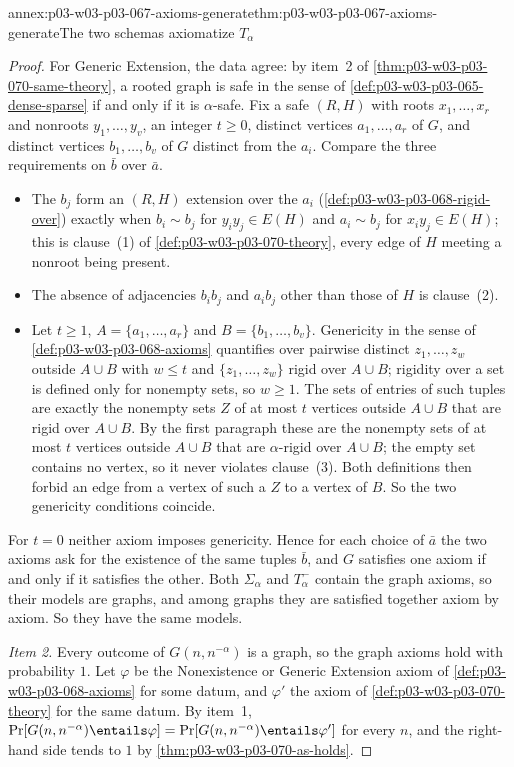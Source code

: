 \begin{annexitem}{annex:p03-w03-p03-067-axioms-generate}{thm:p03-w03-p03-067-axioms-generate}{The two schemas axiomatize \(T_\alpha\)}
\begin{proof}
For Generic Extension, the data agree: by item~2 of
\cref{thm:p03-w03-p03-070-same-theory}, a rooted graph is safe in the sense
of \cref{def:p03-w03-p03-065-dense-sparse} if and only if it is
\(\alpha\)-safe.  Fix a safe \((R,H)\) with roots \(x_1,\ldots,x_r\) and
nonroots \(y_1,\ldots,y_v\), an integer \(t\geq0\), distinct vertices
\(a_1,\ldots,a_r\) of \(G\), and distinct vertices \(b_1,\ldots,b_v\) of
\(G\) distinct from the \(a_i\).  Compare the three requirements on
\(\bar b\) over \(\bar a\).
\begin{itemize}
\item The \(b_j\) form an \((R,H)\) extension over the \(a_i\)
  (\cref{def:p03-w03-p03-068-rigid-over}) exactly when \(b_i\sim b_j\) for
  \(y_iy_j\in E(H)\) and \(a_i\sim b_j\) for \(x_iy_j\in E(H)\); this is
  clause~(1) of \cref{def:p03-w03-p03-070-theory}, every edge of \(H\)
  meeting a nonroot being present.
\item The absence of adjacencies \(b_ib_j\) and \(a_ib_j\) other than those of
  \(H\) is clause~(2).
\item Let \(t\geq1\), \(A=\{a_1,\ldots,a_r\}\) and \(B=\{b_1,\ldots,b_v\}\).
  Genericity in the sense of \cref{def:p03-w03-p03-068-axioms} quantifies
  over pairwise distinct \(z_1,\ldots,z_w\) outside \(A\cup B\) with
  \(w\leq t\) and \(\{z_1,\ldots,z_w\}\) rigid over \(A\cup B\); rigidity
  over a set is defined only for nonempty sets, so \(w\geq1\).  The sets of
  entries of such tuples are exactly the nonempty sets \(Z\) of at most
  \(t\) vertices outside \(A\cup B\) that are rigid over \(A\cup B\).  By the
  first paragraph these are the nonempty sets of at most \(t\) vertices
  outside \(A\cup B\) that are \(\alpha\)-rigid over \(A\cup B\); the empty
  set contains no vertex, so it never violates clause~(3).  Both definitions
  then forbid an edge from a vertex of such a \(Z\) to a vertex of \(B\).  So
  the two genericity conditions coincide.
\end{itemize}
For \(t=0\) neither axiom imposes genericity.  Hence for each choice of
\(\bar a\) the two axioms ask for the existence of the same tuples
\(\bar b\), and \(G\) satisfies one axiom if and only if it satisfies the
other.  Both \(\Sigma_\alpha\) and \(T^-_\alpha\) contain the graph axioms,
so their models are graphs, and among graphs they are satisfied together
axiom by axiom.  So they have the same models.

\emph{Item 2.}  Every outcome of \(G(n,n^{-\alpha})\) is a graph, so the graph
axioms hold with probability \(1\).  Let \(\varphi\) be the Nonexistence or
Generic Extension axiom of \cref{def:p03-w03-p03-068-axioms} for some datum,
and \(\varphi'\) the axiom of \cref{def:p03-w03-p03-070-theory} for the same
datum.  By item~1, \(\Pr[G(n,n^{-\alpha})\entails\varphi]=
\Pr[G(n,n^{-\alpha})\entails\varphi']\) for every \(n\), and the right-hand
side tends to \(1\) by \cref{thm:p03-w03-p03-070-as-holds}.


\end{proof}
\end{annexitem}
